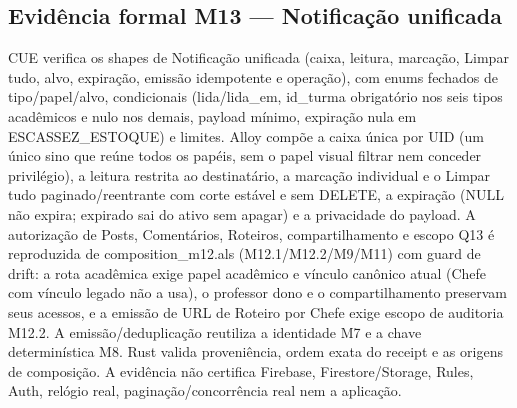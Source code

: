 \subsection*{Evidência formal M13 --- Notificação unificada}
CUE verifica os shapes de Notificação unificada (caixa, leitura, marcação, Limpar tudo, alvo, expiração, emissão idempotente e operação), com enums fechados de tipo/papel/alvo, condicionais (lida/lida\_em, id\_turma obrigatório nos seis tipos acadêmicos e nulo nos demais, payload mínimo, expiração nula em ESCASSEZ\_ESTOQUE) e limites. Alloy compõe a caixa única por UID (um único sino que reúne todos os papéis, sem o papel visual filtrar nem conceder privilégio), a leitura restrita ao destinatário, a marcação individual e o Limpar tudo paginado/reentrante com corte estável e sem DELETE, a expiração (NULL não expira; expirado sai do ativo sem apagar) e a privacidade do payload. A autorização de Posts, Comentários, Roteiros, compartilhamento e escopo Q13 é reproduzida de composition\_m12.als (M12.1/M12.2/M9/M11) com guard de drift: a rota acadêmica exige papel acadêmico e vínculo canônico atual (Chefe com vínculo legado não a usa), o professor dono e o compartilhamento preservam seus acessos, e a emissão de URL de Roteiro por Chefe exige escopo de auditoria M12.2. A emissão/deduplicação reutiliza a identidade M7 e a chave determinística M8. Rust valida proveniência, ordem exata do receipt e as origens de composição. A evidência não certifica Firebase, Firestore/Storage, Rules, Auth, relógio real, paginação/concorrência real nem a aplicação.
